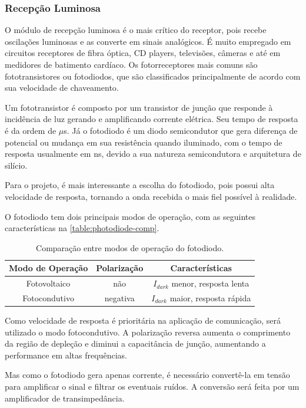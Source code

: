 	\subsubsection{Recepção Luminosa}\label{section:light-reception}
	
	O módulo de recepção luminosa é o mais crítico do receptor, pois recebe oscilações luminosas e as converte em sinais analógicos. É muito empregado em circuitos receptores de fibra óptica, CD players, televisões, câmeras e até em medidores de batimento cardíaco. Os fotorreceptores mais comuns são fototransistores ou fotodiodos, que são classificados principalmente de acordo com sua velocidade de chaveamento. 
	
	Um fototransistor é composto por um transistor de junção que responde à incidência de luz gerando e amplificando corrente elétrica. Seu tempo de resposta é da ordem de $\mu$s. Já o fotodiodo é um diodo semicondutor que gera diferença de potencial ou mudança em sua resistência quando iluminado, com o tempo de resposta usualmente em ns, devido a sua natureza semicondutora e arquitetura de silício.
	
	Para o projeto, é mais interessante a escolha do fotodiodo, pois possui alta velocidade de resposta, tornando a onda recebida o mais fiel possível à realidade.
	
	O fotodiodo tem dois principais modos de operação, com as seguintes características na \autoref{table:photodiode-comp}.
	
	\begin{table}[ht]
		\caption{Comparação entre modos de operação do fotodiodo.}
		\centering
		\begin{tabular}{c c c}
			\hline
			Modo de Operação  & Polarização & Características \\ \hline
			Fotovoltaico & não & $I_{dark}$ menor, resposta lenta \\
			Fotocondutivo & negativa & $I_{dark}$ maior, resposta rápida \\ \hline
		\end{tabular}
		\label{table:photodiode-comp}
	\end{table}
	
	Como velocidade de resposta é prioritária na aplicação de comunicação, será utilizado o modo fotocondutivo. A polarização reversa aumenta o comprimento da região de depleção e diminui a capacitância de junção, aumentando a performance em altas frequências.
	
	Mas como o fotodiodo gera apenas corrente, é necessário convertê-la em tensão para amplificar o sinal e filtrar os eventuais ruídos. A conversão será feita por um amplificador de transimpedância.
	
